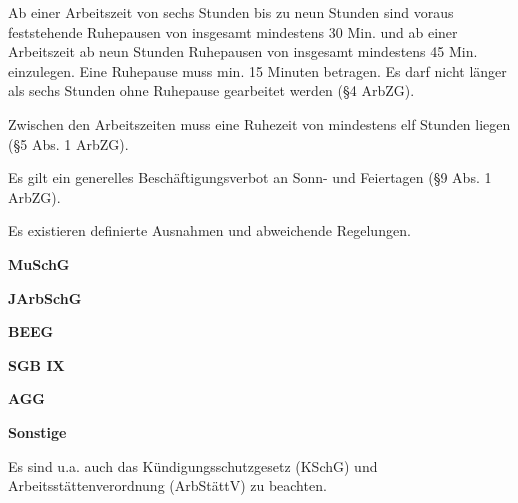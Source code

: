 Ab einer Arbeitszeit von sechs Stunden bis zu neun Stunden sind voraus feststehende Ruhepausen von insgesamt mindestens 30 Min. und ab einer Arbeitszeit ab neun Stunden Ruhepausen von insgesamt mindestens 45 Min. einzulegen. Eine Ruhepause muss min. 15 Minuten betragen. Es darf nicht länger als sechs Stunden ohne Ruhepause gearbeitet werden (§4 ArbZG).

Zwischen den Arbeitszeiten muss eine Ruhezeit von mindestens elf Stunden liegen (§5 Abs. 1 ArbZG).

Es gilt ein generelles Beschäftigungsverbot an Sonn- und Feiertagen (§9 Abs. 1 ArbZG).

Es existieren definierte Ausnahmen und abweichende Regelungen.

\textbf{MuSchG}

\textbf{JArbSchG}

\textbf{BEEG}

\textbf{SGB IX}

\textbf{AGG}

\textbf{Sonstige}

Es sind u.a. auch das Kündigungsschutzgesetz (KSchG) und Arbeitsstättenverordnung (ArbStättV) zu beachten.